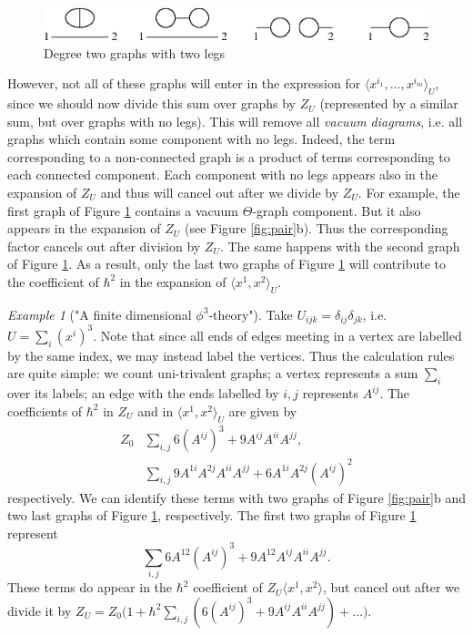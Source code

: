 \documentclass[10pt]{amsart}
\theoremstyle{definition}
\theoremstyle{remark}
\newtheorem{ex}[thm]{Example}
\def\<{\langle}
\def\>{\rangle}
\newcommand{\h}{\hbar}
\newcommand{\Gd}{\delta}
\newcommand{\GT}{\Theta}
\begin{document}
\begin{figure}
\includegraphics[width=5in]{twolegs.eps}
\caption{Degree two graphs with two legs} \label{fig_corr}
\end{figure}

However, not all of these graphs will enter in the expression for
$\<x^{i_1},\dots,x^{i_m}\>_U$, since we should now divide this sum
over graphs by $Z_U$ (represented by a similar sum, but over
graphs with no legs). This will remove all {\em vacuum diagrams},
i.e. all graphs which contain some component with no legs. Indeed,
the term corresponding to a non-connected graph is a product of
terms corresponding to each connected component. Each component
with no legs appears also in the expansion of $Z_U$ and thus will
cancel out after we divide by $Z_U$. For example, the first graph
of Figure \ref{fig_corr} contains a vacuum $\GT$-graph component.
But it also appears in the expansion of $Z_U$ (see Figure
\ref{fig:pair}b). Thus the corresponding factor cancels out after
division by $Z_U$. The same happens with the second graph of
Figure \ref{fig_corr}. As a result, only the last two graphs of
Figure \ref{fig_corr} will contribute to the coefficient of $\h^2$
in the expansion of $\<x^1, x^2\>_U$.

\begin{ex}["A finite dimensional $\phi^3$-theory"]
Take $U_{ijk}=\Gd_{ij}\Gd_{jk}$, i.e. $U=\sum_i(x^i)^3$. Note that
since all ends of edges meeting in a vertex are labelled by the
same index, we may instead label the vertices. Thus the
calculation rules are quite simple: we count uni-trivalent graphs;
a vertex represents a sum $\sum_i$ over its labels; an edge with
the ends labelled by $i,j$ represents $A^{ij}$. The coefficients
of $\h^2$ in $Z_U$ and in $\<x^1,x^2\>_U$ are given by
$$
    \begin{aligned}
Z_0&\sum_{i,j} 6(A^{ij})^3+9A^{ij}A^{ii}A^{jj},\\&
\sum_{i,j}9A^{1i}A^{2j}A^{ii}A^{jj}+6A^{1i}A^{2j}(A^{ij})^2
     \end{aligned}
$$
respectively. We can identify these terms with two graphs of
Figure \ref{fig:pair}b and two last graphs of Figure
\ref{fig_corr}, respectively. The first two graphs of Figure
\ref{fig_corr} represent
$$
   \sum_{i,j} 6A^{12}(A^{ij})^3+9A^{12}A^{ij}A^{ii}A^{jj}.
$$
These terms do appear in the $\h^2$ coefficient of
$Z_U\<x^1,x^2\>$, but cancel out after we divide it by
$Z_U=Z_0\big(1+\h^2\sum_{i,j}(6(A^{ij})^3+9A^{ij}A^{ii}A^{jj})
+\dots\big)$.
\end{ex}
\end{document}
